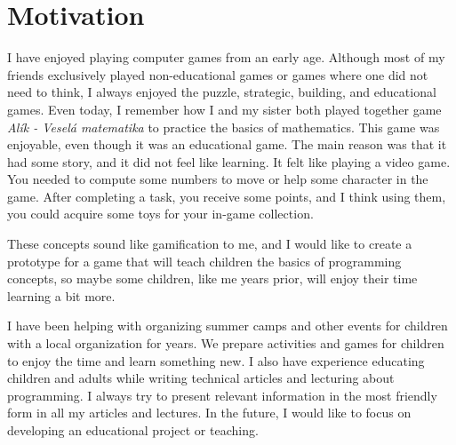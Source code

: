 \section{Motivation}

I have enjoyed playing computer games from an early age.
Although most of my friends exclusively played non-educational games or games where one did not need to think, I always enjoyed the puzzle, strategic, building, and educational games.
Even today, I remember how I and my sister both played together game \emph{Alík - Veselá matematika} to practice the basics of mathematics.
This game was enjoyable, even though it was an educational game.
The main reason was that it had some story, and it did not feel like learning.
It felt like playing a video game.
You needed to compute some numbers to move or help some character in the game.
After completing a task, you receive some points, and I think using them, you could acquire some toys for your in-game collection.

These concepts sound like gamification to me, and I would like to create a prototype for a game that will teach children the basics of programming concepts, so maybe some children, like me years prior, will enjoy their time learning a bit more.

I have been helping with organizing summer camps and other events for children with a local organization for years.
We prepare activities and games for children to enjoy the time and learn something new.
I also have experience educating children and adults while writing technical articles and lecturing about programming.
I always try to present relevant information in the most friendly form in all my articles and lectures.
In the future, I would like to focus on developing an educational project or teaching.
